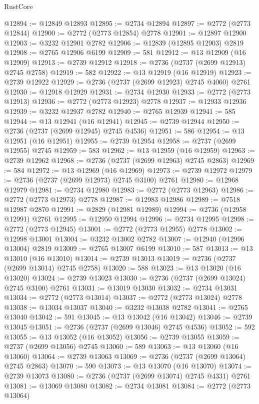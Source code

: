 \begin{lexlean}{RustCore}
\begin{coremodule}
@12894 := @12849 @12893
@12895 := @2734 @12894
@12897 := @2772 (@2773 @12844)
@12900 := @2772 (@2773 @12854) @2778
@12901 := @12897 @12900
@12903 := @3232 @12901 @2782
@12906 := @12839 (@12895 @12903) @2819
@12908 := @2765 @12906 @6199
@12909 := 581
@12912 := @13 @12909 (@16 @12909)
@12913 := @2739 @12912
@12918 := @2736 (@2737 (@2699 @12913) @2745 @2758)
@12919 := 582
@12922 := @13 @12919 (@16 @12919)
@12923 := @2739 @12922
@12929 := @2736 (@2737 (@2699 @12923) @2745 @4060) @2761
@12930 := @12918 @12929
@12931 := @2734 @12930
@12933 := @2772 (@2773 @12913)
@12936 := @2772 (@2773 @12923) @2778
@12937 := @12933 @12936
@12939 := @3232 @12937 @2782
@12940 := @2765 @12939
@12941 := 585
@12944 := @13 @12941 (@16 @12941)
@12945 := @2739 @12944
@12950 := @2736 (@2737 (@2699 @12945) @2745 @4536)
@12951 := 586
@12954 := @13 @12951 (@16 @12951)
@12955 := @2739 @12954
@12958 := @2737 (@2699 @12955) @2745
@12959 := 583
@12962 := @13 @12959 (@16 @12959)
@12963 := @2739 @12962
@12968 := @2736 (@2737 (@2699 @12963) @2745 @2863)
@12969 := 584
@12972 := @13 @12969 (@16 @12969)
@12973 := @2739 @12972
@12979 := @2736 (@2737 (@2699 @12973) @2745 @3100) @2761
@12980 := @12968 @12979
@12981 := @2734 @12980
@12983 := @2772 (@2773 @12963)
@12986 := @2772 (@2773 @12973) @2778
@12987 := @12983 @12986
@12989 := @7518 @12987 @2870
@12991 := @2829 (@12981 @12989)
@12994 := @2736 (@12958 @12991) @2761
@12995 := @12950 @12994
@12996 := @2734 @12995
@12998 := @2772 (@2773 @12945)
@13001 := @2772 (@2773 @12955) @2778
@13002 := @12998 @13001
@13004 := @3232 @13002 @2782
@13007 := @12940 (@12996 @13004) @2819
@13009 := @2765 @13007 @6199
@13010 := 587
@13013 := @13 @13010 (@16 @13010)
@13014 := @2739 @13013
@13019 := @2736 (@2737 (@2699 @13014) @2745 @2758)
@13020 := 588
@13023 := @13 @13020 (@16 @13020)
@13024 := @2739 @13023
@13030 := @2736 (@2737 (@2699 @13024) @2745 @3100) @2761
@13031 := @13019 @13030
@13032 := @2734 @13031
@13034 := @2772 (@2773 @13014)
@13037 := @2772 (@2773 @13024) @2778
@13038 := @13034 @13037
@13040 := @3232 @13038 @2782
@13041 := @2765 @13040
@13042 := 591
@13045 := @13 @13042 (@16 @13042)
@13046 := @2739 @13045
@13051 := @2736 (@2737 (@2699 @13046) @2745 @4536)
@13052 := 592
@13055 := @13 @13052 (@16 @13052)
@13056 := @2739 @13055
@13059 := @2737 (@2699 @13056) @2745
@13060 := 589
@13063 := @13 @13060 (@16 @13060)
@13064 := @2739 @13063
@13069 := @2736 (@2737 (@2699 @13064) @2745 @2863)
@13070 := 590
@13073 := @13 @13070 (@16 @13070)
@13074 := @2739 @13073
@13080 := @2736 (@2737 (@2699 @13074) @2745 @4331) @2761
@13081 := @13069 @13080
@13082 := @2734 @13081
@13084 := @2772 (@2773 @13064)

\end{coremodule}
\end{lexlean}
